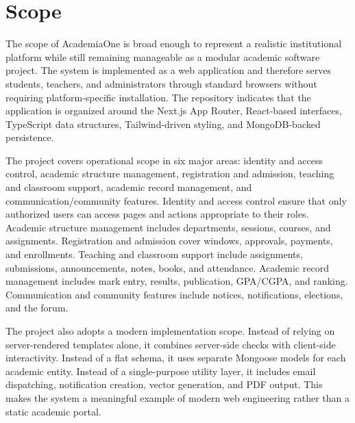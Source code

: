 \documentclass[12pt,a4paper]{report}
\newcommand{\systemName}{AcademiaOne}
\begin{document}
\section{Scope}
The scope of \systemName{} is broad enough to represent a realistic institutional platform while still remaining manageable as a modular academic software project. The system is implemented as a web application and therefore serves students, teachers, and administrators through standard browsers without requiring platform-specific installation. The repository indicates that the application is organized around the Next.js App Router, React-based interfaces, TypeScript data structures, Tailwind-driven styling, and MongoDB-backed persistence.

The project covers operational scope in six major areas: identity and access control, academic structure management, registration and admission, teaching and classroom support, academic record management, and communication/community features. Identity and access control ensure that only authorized users can access pages and actions appropriate to their roles. Academic structure management includes departments, sessions, courses, and assignments. Registration and admission cover windows, approvals, payments, and enrollments. Teaching and classroom support include assignments, submissions, announcements, notes, books, and attendance. Academic record management includes mark entry, results, publication, GPA/CGPA, and ranking. Communication and community features include notices, notifications, elections, and the forum.

The project also adopts a modern implementation scope. Instead of relying on server-rendered templates alone, it combines server-side checks with client-side interactivity. Instead of a flat schema, it uses separate Mongoose models for each academic entity. Instead of a single-purpose utility layer, it includes email dispatching, notification creation, vector generation, and PDF output. This makes the system a meaningful example of modern web engineering rather than a static academic portal.
\end{document}

